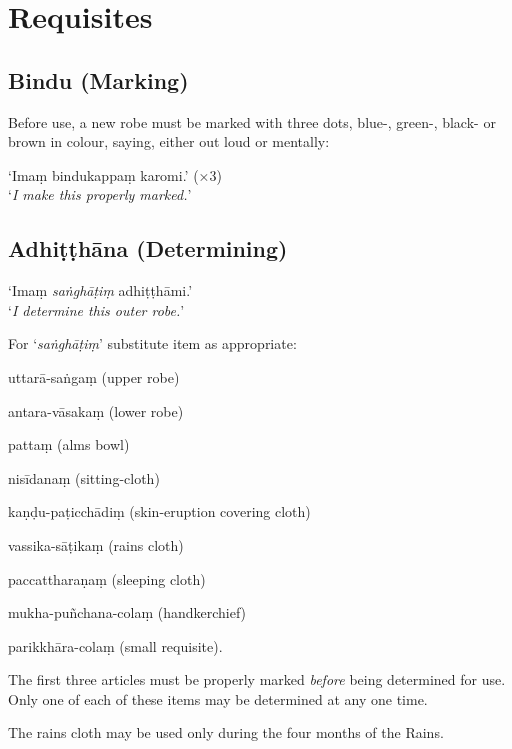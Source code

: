 \chapter{Requisites}

\section{Bindu (Marking)}

Before use, a new robe must be marked with three dots, blue-, green-, black- or
brown in colour, saying, either out loud or mentally:

‘Imaṃ bindukappaṃ karomi.’ (×3)\\
‘\emph{I make this properly marked.}’


\section{Adhiṭṭhāna (Determining)}

‘Imaṃ \emph{saṅghāṭiṃ} adhiṭṭhāmi.’\\
‘\emph{I determine this outer robe.}’

For ‘\emph{saṅghāṭiṃ}’ substitute item as appropriate:

\begin{packeditemize}

\item uttarā-saṅgaṃ (upper robe)
\item antara-vāsakaṃ (lower robe)
\item pattaṃ (alms bowl)
\item nisīdanaṃ (sitting-cloth)
\item kaṇḍu-paṭicchādiṃ (skin-eruption covering cloth)
\item vassika-sāṭikaṃ (rains cloth)
\item paccattharaṇaṃ (sleeping cloth)
\item mukha-puñchana-colaṃ (handkerchief)
\item parikkhāra-colaṃ (small requisite).

\end{packeditemize}


The first three articles must be properly marked \emph{before} being determined
for use. Only one of each of these items may be determined at any one time.

The rains cloth may be used only during the  four months of the Rains.

